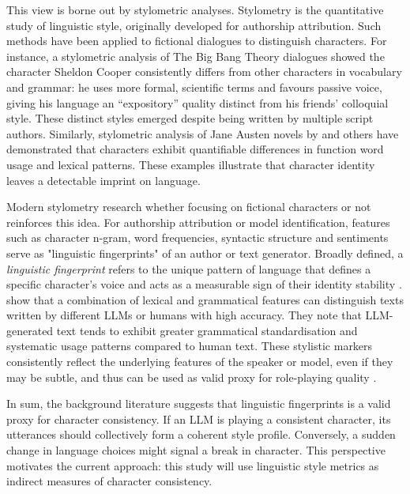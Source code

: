 \documentclass{article}
\begin{document}
This view is borne out by stylometric analyses. Stylometry is the quantitative study of linguistic style, originally developed for authorship attribution. Such methods have been applied to fictional dialogues to distinguish characters. For instance, a stylometric analysis of The Big Bang Theory dialogues \citep{van2016stylometry} showed the character Sheldon Cooper consistently differs from other characters in vocabulary and grammar: he uses more formal, scientific terms and favours passive voice, giving his language an “expository” quality distinct from his friends' colloquial style. These distinct styles emerged despite being written by multiple script authors. Similarly, stylometric analysis of Jane Austen novels by \citet{burrows1987computation} and others have demonstrated that characters exhibit quantifiable differences in function word usage and lexical patterns. These examples illustrate that character identity leaves a detectable imprint on language.

Modern stylometry research whether focusing on fictional characters or not reinforces this idea. For authorship attribution or model identification, features such as character n-gram, word frequencies, syntactic structure and sentiments serve as "linguistic fingerprints" of an author or text generator. Broadly defined, a \emph{linguistic fingerprint} refers to the unique pattern of language that defines a specific character's voice and acts as a measurable sign of their identity stability \citep{li2006fingerprint, bao2026eval4sim}. \citet{przystalski2025stylometry} show that a combination of lexical and grammatical features can distinguish texts written by different LLMs or humans with high accuracy. They note that LLM-generated text tends to exhibit greater grammatical standardisation and systematic usage patterns compared to human text. These stylistic markers consistently reflect the underlying features of the speaker or model, even if they may be subtle, and thus can be used as valid proxy for role-playing quality \citep{zhou2023characterglm, chen2024review, wang2024rolellm, wang2024incharacter, bhandari2025ocean}.

In sum, the background literature suggests that linguistic fingerprints is a valid proxy for character consistency. If an LLM is playing a consistent character, its utterances should collectively form a coherent style profile. Conversely, a sudden change in language choices might signal a break in character. This perspective motivates the current approach: this study will use linguistic style metrics as indirect measures of character consistency.
\end{document}
